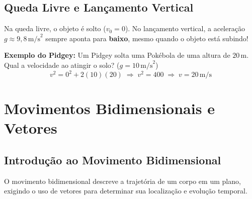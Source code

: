 \documentclass[10.5pt, a4paper]{extarticle}
\begin{document}
\subsection{Queda Livre e Lançamento Vertical}

\begin{charmanderbox}
Na queda livre, o objeto é solto ($v_0 = 0$). No lançamento vertical, a aceleração $g \approx 9{,}8\,\text{m/s}^2$ sempre aponta para \textbf{baixo}, mesmo quando o objeto está subindo!
\end{charmanderbox}

\begin{bulbabox}
\textbf{Exemplo do Pidgey:} Um Pidgey solta uma Pokébola de uma altura de $20\,\text{m}$. Qual a velocidade ao atingir o solo? ($g=10\,\text{m/s}^2$)
\[
  v^2 = 0^2 + 2(10)(20) \;\Rightarrow\; v^2 = 400 \;\Rightarrow\; v = 20\,\text{m/s}
\]
\end{bulbabox}

\section{Movimentos Bidimensionais e Vetores}

\subsection{Introdução ao Movimento Bidimensional}

O movimento bidimensional descreve a trajetória de um corpo em um plano, exigindo o uso de vetores para determinar sua localização e evolução temporal.

\begin{center}
\end{center}
\end{document}
